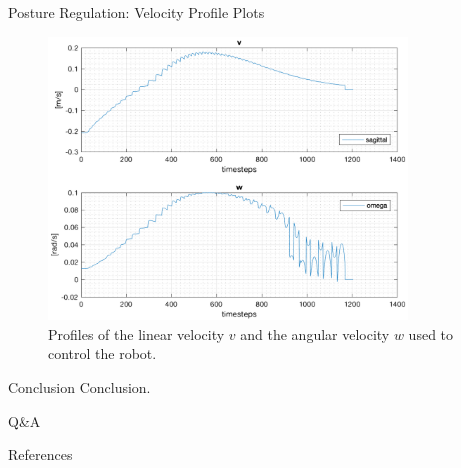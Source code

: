 \documentclass[10pt]{beamer}
\begin{document}
    \begin{frame}{Posture Regulation: Velocity Profile Plots}
        \begin{figure}
            \caption{Profiles of the linear velocity $v$ and the angular
                velocity $w$ used to control the robot.}
            \vspace{-0.3cm}
            \includegraphics[width=0.85\textwidth]{images/unicycle_velocities.png}
        \end{figure}
    \end{frame}

    \begin{frame}{Conclusion}
        Conclusion.
    \end{frame}

    \begin{frame}[standout]
        Q\&A
    \end{frame}

    \appendix

    \begin{frame}{References}
        
        
    \end{frame}
\end{document}
